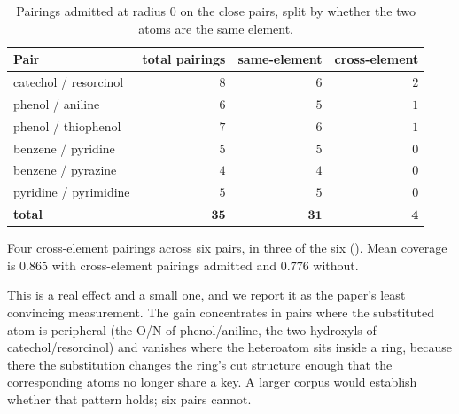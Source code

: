 \documentclass[11pt,twocolumn,a4paper]{article}
\theoremstyle{scthm}
\theoremstyle{definition}
\theoremstyle{remark}
\begin{document}
\begin{table}[htbp]
\centering\small
\caption{Pairings admitted at radius $0$ on the \textsf{close} pairs,
split by whether the two atoms are the same element.}
\label{tab:cross}
\begin{tabular}{@{}lrrr@{}}
\toprule
Pair & total pairings & same-element & cross-element\\
\midrule
catechol / resorcinol & $8$ & $6$ & $2$\\
phenol / aniline & $6$ & $5$ & $1$\\
phenol / thiophenol & $7$ & $6$ & $1$\\
benzene / pyridine & $5$ & $5$ & $0$\\
benzene / pyrazine & $4$ & $4$ & $0$\\
pyridine / pyrimidine & $5$ & $5$ & $0$\\
\midrule
\textbf{total} & $\mathbf{35}$ & $\mathbf{31}$ & $\mathbf{4}$\\
\bottomrule
\end{tabular}
\end{table}

Four cross-element pairings across six pairs, in three of the six
(). Mean coverage is $0.865$ with cross-element pairings
admitted and $0.776$ without.

This is a real effect and a small one, and we report it as the paper's
least convincing measurement. The gain concentrates in pairs where the
substituted atom is peripheral (the O/N of phenol/aniline, the two
hydroxyls of catechol/resorcinol) and vanishes where the heteroatom sits
inside a ring, because there the substitution changes the ring's cut
structure enough that the corresponding atoms no longer share a key. A
larger corpus would establish whether that pattern holds; six pairs
cannot.
\end{document}
